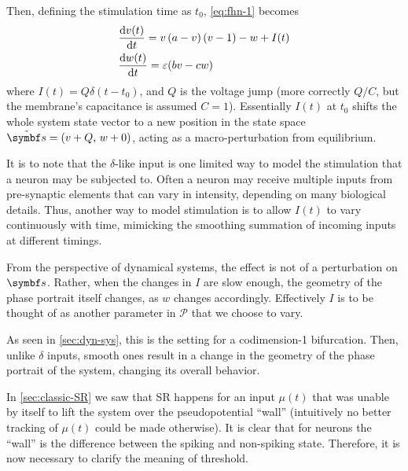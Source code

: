 Then, defining the stimulation time as $t_0$, \ref{eq:fhn-1} becomes
\begin{align}
    &\odv{v(t)}{t} = v\left(a-v\right)\left(v-1\right)-w+ I(t) \\
    &\odv{w(t)}{t} = \varepsilon (bv - cw)
\end{align}
where $I(t) = Q \delta (t - t_0)$, and $Q$ is the voltage jump (more correctly $Q/C$, but the membrane's capacitance is assumed $C=1$). 
Essentially $I(t)$ at $t_0$ shifts the whole system state vector to a new position in the state space $\tilde{\vb{s}} = \left(v + Q \text{, } w + 0\right)$, acting as a macro-perturbation from equilibrium.

It is to note that the $\delta$-like input is one limited way to model the stimulation that a neuron may be subjected to. 
Often a neuron may receive multiple inputs from pre-synaptic elements that can vary in intensity, depending on many biological details. 
Thus, another way to model stimulation is to allow $I(t)$ to vary continuously with time, mimicking the smoothing summation of incoming inputs at different timings. 

From the perspective of dynamical systems, the effect is not of a perturbation on $\vb{s}$. 
Rather, when the changes in $I$ are slow enough, the geometry of the phase portrait itself changes, as $w$ changes accordingly. %
Effectively $I$ is to be thought of as another parameter in $\mathcal{P}$ that we choose to vary.

As seen in \ref{sec:dyn-sys}, this is the setting for a codimension-1 bifurcation. 
Then, unlike $\delta$ inputs, smooth ones result in a change in the geometry of the phase portrait of the system, changing its overall behavior.

In \ref{sec:classic-SR} we saw that SR happens for an input $\mu(t)$ that was unable by itself to lift the system over the pseudopotential \enquote{wall} (intuitively no better tracking of $\mu(t)$ could be made otherwise). 
It is clear that for neurons the \enquote{wall} is the difference between the spiking and non-spiking state. 
Therefore, it is now necessary to clarify the meaning of threshold. 

